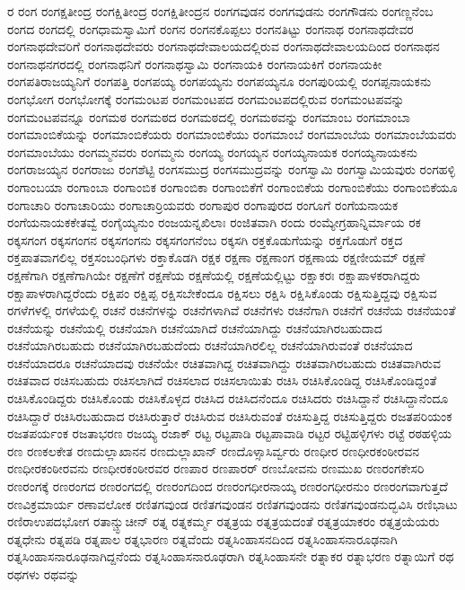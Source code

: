 {ರ
ರಂಗ
ರಂಗಕ್ಷತೀಂದ್ರ
ರಂಗಕ್ಷಿತೀಂದ್ರ
ರಂಗಕ್ಷಿತೀಂದ್ರನ
ರಂಗಗವುಡನ
ರಂಗಗವುಡನು
ರಂಗಗೌಡನು
ರಂಗಣ್ಣನೆಂಬ
ರಂಗದ
ರಂಗದಲ್ಲಿ
ರಂಗಧಾಮಸ್ವಾಮಿಗೆ
ರಂಗನ
ರಂಗನಕೊಪ್ಪಲು
ರಂಗನತಿಟ್ಟು
ರಂಗನಾಥ
ರಂಗನಾಥದೇವರ
ರಂಗನಾಥದೇವರಿಗೆ
ರಂಗನಾಥದೇವರು
ರಂಗನಾಥದೇವಾಲಯದಲ್ಲಿರುವ
ರಂಗನಾಥದೇವಾಲಯದಿಂದ
ರಂಗನಾಥನ
ರಂಗನಾಥನಗರದಲ್ಲಿ
ರಂಗನಾಥನಿಗೆ
ರಂಗನಾಥಸ್ವಾಮಿ
ರಂಗನಾಯಕಿ
ರಂಗನಾಯಕಿಗೆ
ರಂಗನಾಯಕೀ
ರಂಗಪತಿರಾಜಯ್ಯನಿಗೆ
ರಂಗಪತ್ತಿ
ರಂಗಪಯ್ಯ
ರಂಗಪಯ್ಯನು
ರಂಗಪಯ್ಯನೂ
ರಂಗಪುರಿಯಲ್ಲಿ
ರಂಗಪ್ಪನಾಯಕನು
ರಂಗಭೋಗ
ರಂಗಭೋಗಕ್ಕೆ
ರಂಗಮಂಟಪ
ರಂಗಮಂಟಪದ
ರಂಗಮಂಟಪದಲ್ಲಿರುವ
ರಂಗಮಂಟಪವನ್ನು
ರಂಗಮಂಟಪವನ್ನೂ
ರಂಗಮಠ
ರಂಗಮಠದ
ರಂಗಮಠದಲ್ಲಿ
ರಂಗಮಠವನ್ನು
ರಂಗಮಾಂಬ
ರಂಗಮಾಂಬಾ
ರಂಗಮಾಂಬಿಕೆಯನ್ನು
ರಂಗಮಾಂಬಿಕೆಯರು
ರಂಗಮಾಂಬಿಕೆಯು
ರಂಗಮಾಂಬೆ
ರಂಗಮಾಂಬೆಯ
ರಂಗಮಾಂಬೆಯವರು
ರಂಗಮಾಂಬೆಯು
ರಂಗಮ್ಮನವರು
ರಂಗಮ್ಮನು
ರಂಗಯ್ಯ
ರಂಗಯ್ಯನ
ರಂಗಯ್ಯನಾಯಕ
ರಂಗಯ್ಯನಾಯಕನು
ರಂಗರಾಜಯ್ಯನ
ರಂಗರಾಜು
ರಂಗಶೆಟ್ಟಿ
ರಂಗಸಮುದ್ರ
ರಂಗಸಮುದ್ರವನ್ನು
ರಂಗಸ್ವಾಮಿ
ರಂಗಸ್ವಾಮಿಯವುರು
ರಂಗಹಳ್ಳಿ
ರಂಗಾಂಬಯಾ
ರಂಗಾಂಬಾ
ರಂಗಾಂಬಿಕ
ರಂಗಾಂಬಿಕಾ
ರಂಗಾಂಬಿಕೆಗೆ
ರಂಗಾಂಬಿಕೆಯ
ರಂಗಾಂಬಿಕೆಯು
ರಂಗಾಂಬಿಕೆಯೂ
ರಂಗಾಚಾರಿ
ರಂಗಾಚಾರಿಯು
ರಂಗಾಚಾರ್ರಿಯವರು
ರಂಗಾಪುರ
ರಂಗಾಪುರದ
ರಂಗೂಗೆ
ರಂಗೆಯನಾಯಕ
ರಂಗೆಯನಾಯಕಕೇತವ್ವೆ
ರಂಗೈಯ್ಯನುಂ
ರಂಜಯನ್ನಖಿಲಾಃ
ರಂಜಿತವಾಗಿ
ರಂದು
ರಂಮ್ಯೇಗ್ರಹಾನ್ನಿರ್ಮಾಯ
ರಕ
ರಕ್ಕಸಗಂಗ
ರಕ್ಕಸಗಂಗನ
ರಕ್ಕಸಗಂಗನು
ರಕ್ಕಸಗಂಗನೆಂಬ
ರಕ್ಕಸಗಿ
ರಕ್ತಕೊಡುಗೆಯನ್ನು
ರಕ್ತಗೊಡುಗೆ
ರಕ್ತದ
ರಕ್ತಪಾತವಾಗಲಿಲ್ಲ
ರಕ್ತಸಂಬಂಧಿಗಳು
ರಕ್ತಾಕೊಡಗಿ
ರಕ್ಷಕ
ರಕ್ಷಣಾ
ರಕ್ಷಣಾಂಗ
ರಕ್ಷಣಾಯ
ರಕ್ಷಣೀಯಮ್
ರಕ್ಷಣೆ
ರಕ್ಷಣೆಗಾಗಿ
ರಕ್ಷಣೆಗಾಗಿಯೇ
ರಕ್ಷಣೆಗೆ
ರಕ್ಷಣೆಯ
ರಕ್ಷಣೆಯಲ್ಲಿ
ರಕ್ಷಣೆಯಲ್ಲಿಟ್ಟು
ರಕ್ಷಾಕರಃ
ರಕ್ಷಾಪಾಳಕರಾಗಿದ್ದರು
ರಕ್ಷಾಪಾಳರಾಗಿದ್ದರೆಂದು
ರಕ್ಷಿಪಂ
ರಕ್ಷಿಪ್ಪ
ರಕ್ಷಿಸಬೇಕೆಂದೂ
ರಕ್ಷಿಸಲು
ರಕ್ಷಿಸಿ
ರಕ್ಷಿಸಿಕೊಂಡು
ರಕ್ಷಿಸುತ್ತಿದ್ದವು
ರಕ್ಷಿಸುವ
ರಗಳೆಗಳಲ್ಲಿ
ರಗಳೆಯಲ್ಲಿ
ರಚನೆ
ರಚನೆಗಳನ್ನು
ರಚನೆಗಳಾಗಿವೆ
ರಚನೆಗಳು
ರಚನೆಗಾಗಿ
ರಚನೆಗೆ
ರಚನೆಯ
ರಚನೆಯಂತೆ
ರಚನೆಯನ್ನು
ರಚನೆಯಲ್ಲಿ
ರಚನೆಯಾಗಿ
ರಚನೆಯಾಗಿದೆ
ರಚನೆಯಾಗಿದ್ದು
ರಚನೆಯಾಗಿರಬಹುದಾದ
ರಚನೆಯಾಗಿರಬಹುದು
ರಚನೆಯಾಗಿರಬಹುದೆಂದು
ರಚನೆಯಾಗಿರಲಿಲ್ಲ
ರಚನೆಯಾಗಿರುವಂತೆ
ರಚನೆಯಾದ
ರಚನೆಯಾದರೂ
ರಚನೆಯಾದವು
ರಚನೆಯೇ
ರಚಿತವಾಗಿದ್ದ
ರಚಿತವಾಗಿದ್ದು
ರಚಿತವಾಗಿರಬಹುದು
ರಚಿತವಾಗಿರುವ
ರಚಿತವಾದ
ರಚಿಸಬಹುದು
ರಚಿಸಲಾಗಿದೆ
ರಚಿಸಲಾದ
ರಚಿಸಲಾಯಿತು
ರಚಿಸಿ
ರಚಿಸಿಕೊಂಡಿದ್ದ
ರಚಿಸಿಕೊಂಡಿದ್ದಂತೆ
ರಚಿಸಿಕೊಂಡಿದ್ದರು
ರಚಿಸಿಕೊಂಡು
ರಚಿಸಿಕೊಳ್ಳದ
ರಚಿಸಿದ
ರಚಿಸಿದನೆಂದೂ
ರಚಿಸಿದರು
ರಚಿಸಿದ್ದಾನೆ
ರಚಿಸಿದ್ದಾನೆಂದೂ
ರಚಿಸಿದ್ದಾರೆ
ರಚಿಸಿರಬಹುದಾದ
ರಚಿಸಿರುತ್ತಾರೆ
ರಚಿಸಿರುವ
ರಚಿಸಿರುವಂತೆ
ರಚಿಸುತ್ತಿದ್ದ
ರಚಿಸುತ್ತಿದ್ದರು
ರಜತಪರಿಯಂಕ
ರಜತಪರ್ಯಂಕ
ರಜತಾಭರಣ
ರಜಯ್ಯ
ರಜಾಕ್
ರಟ್ಟ
ರಟ್ಟಪಾಡಿ
ರಟ್ಟಪಾವಾಡಿ
ರಟ್ಟರ
ರಟ್ಟಿಹಳ್ಳಿಗಳು
ರಟ್ಟೆ
ರಠಹಳ್ಳಿಯ
ರಣ
ರಣಕಲಕೇತ
ರಣದುಲ್ಲಾಖಾನನ
ರಣದುಲ್ಲಾಖಾನ್
ರಣದೊಳ್ಸಾಸಿರ್ವ್ವರು
ರಣಧೀರ
ರಣಧೀರಕಂಠೀರವನ
ರಣಧೀರಕಂಠೀರವನು
ರಣಧೀರಕಂಠೀರವರ
ರಣಪಾರ
ರಣಪಾರರ್
ರಣಬೋವನು
ರಣಮುಖ
ರಣರಂಗಕೇಸರಿ
ರಣರಂಗಕ್ಕೆ
ರಣರಂಗದ
ರಣರಂಗದಲ್ಲಿ
ರಣರಂಗದಿಂದ
ರಣರಂಗಧೀರನಾಯ್ಕ
ರಣರಂಗಧೀರನುಂ
ರಣರಂಗವಾಗುತ್ತದೆ
ರಣವಿಕ್ರಮಾರ್ಯ
ರಣಾವಲೋಕ
ರಣಿತಗವುಂಡ
ರಣಿತಗವುಂಡನ
ರಣಿತಗವುಂಡನು
ರಣಿತಗವುಂಡನುದ್ಭವಿಸಿ
ರಣಿಭಾಟು
ರಣಿರಾಉಪದಭೋಗ
ರತಾನ್ಚ್ಛುಚೀನ್
ರತ್ನ
ರತ್ನಕರ್ಮ್ಮ
ರತ್ನತ್ರಯ
ರತ್ನತ್ರಯದಂತೆ
ರತ್ನತ್ರಯಾಕರಂ
ರತ್ನತ್ರಯೆಯರು
ರತ್ನಧೇನು
ರತ್ನಪಡಿ
ರತ್ನಪಾಲ
ರತ್ನಭಾರಣ
ರತ್ನವೆಂದು
ರತ್ನಸಿಂಹಾಸನದಿಂದ
ರತ್ನಸಿಂಹಾಸನಾರೂಢನಾಗಿ
ರತ್ನಸಿಂಹಾಸನಾರೂಢನಾಗಿದ್ದನೆಂದು
ರತ್ನಸಿಂಹಾಸನಾರೂಢರಾಗಿ
ರತ್ನಸಿಂಹಾಸನೇ
ರತ್ನಾಕರ
ರತ್ನಾಭರಣ
ರತ್ನಾಯಿಗೆ
ರಥ
ರಥಗಳು
ರಥವನ್ನು
}
